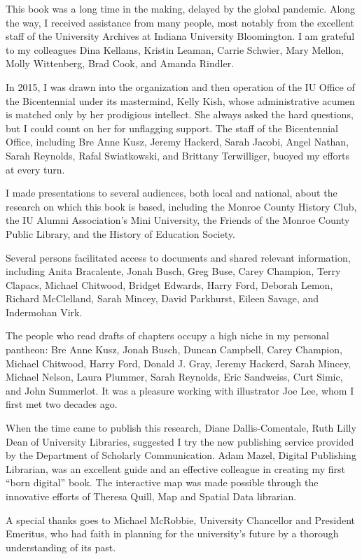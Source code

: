 \documentclass[
  american,
  letterpaper,
]{scrreprt}
\begin{document}
This book was a long time in the making, delayed by the global pandemic.
Along the way, I received assistance from many people, most notably from
the excellent staff of the University Archives at Indiana University
Bloomington. I am grateful to my colleagues Dina Kellams, Kristin
Leaman, Carrie Schwier, Mary Mellon, Molly Wittenberg, Brad Cook, and
Amanda Rindler.

In 2015, I was drawn into the organization and then operation of the IU
Office of the Bicentennial under its mastermind, Kelly Kish, whose
administrative acumen is matched only by her prodigious intellect. She
always asked the hard questions, but I could count on her for unflagging
support. The staff of the Bicentennial Office, including Bre Anne Kusz,
Jeremy Hackerd, Sarah Jacobi, Angel Nathan, Sarah Reynolds, Rafal
Swiatkowski, and Brittany Terwilliger, buoyed my efforts at every turn.

I made presentations to several audiences, both local and national,
about the research on which this book is based, including the Monroe
County History Club, the IU Alumni Association's Mini University, the
Friends of the Monroe County Public Library, and the History of
Education Society.

Several persons facilitated access to documents and shared relevant
information, including Anita Bracalente, Jonah Busch, Greg Buse, Carey
Champion, Terry Clapacs, Michael Chitwood, Bridget Edwards, Harry Ford,
Deborah Lemon, Richard McClelland, Sarah Mincey, David Parkhurst, Eileen
Savage, and Indermohan Virk.

The people who read drafts of chapters occupy a high niche in my
personal pantheon: Bre Anne Kusz, Jonah Busch, Duncan Campbell, Carey
Champion, Michael Chitwood, Harry Ford, Donald J. Gray, Jeremy Hackerd,
Sarah Mincey, Michael Nelson, Laura Plummer, Sarah Reynolds, Eric
Sandweiss, Curt Simic, and John Summerlot. It was a pleasure working
with illustrator Joe Lee, whom I first met two decades ago.

When the time came to publish this research, Diane Dallis-Comentale,
Ruth Lilly Dean of University Libraries, suggested I try the new
publishing service provided by the Department of Scholarly
Communication. Adam Mazel, Digital Publishing Librarian, was an
excellent guide and an effective colleague in creating my first ``born
digital'' book. The interactive map was made possible through the
innovative efforts of Theresa Quill, Map and Spatial Data librarian.

A special thanks goes to Michael McRobbie, University Chancellor and
President Emeritus, who had faith in planning for the university's
future by a thorough understanding of its past.
\end{document}

